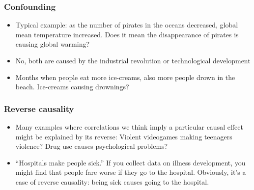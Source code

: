\begin{frame}
\frametitle{Confounding}\label{confounding}
\centering

\begin{itemize}[<+->]
  \item Typical example: as the number of pirates in the oceans decreased, global mean temperature increased. Does it mean the disappearance of pirates is causing global warming?
  \item No, both are caused by the industrial revolution or technological development
  \item Months when people eat more ice-creams, also more people drown in the beach. Ice-creams causing drownings?
\end{itemize}

\end{frame}
\note{}

\begin{frame}
\frametitle{Reverse causality}\label{reverse}
\centering

\begin{itemize}
  \item Many examples where correlations we think imply a particular causal effect might be explained by its reverse: Violent videogames making teenagers violence? Drug use causes psychological problems?
  \item ``Hospitals make people sick.'' If you collect data on illness development, you might find that people fare worse if they go to the hospital. Obviously, it's a case of reverse causality: being sick causes going to the hospital.
\end{itemize}

\end{frame}
\note{}


